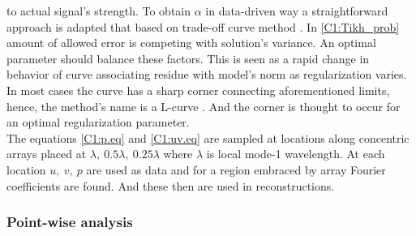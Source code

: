 \documentclass[12pt]{article}
\begin{document}
to actual signal's strength. To obtain $\alpha$ in data-driven way a straightforward approach is 
adapted that based on 
trade-off curve method \citep{hansen1993use}. In \eqref{C1:Tikh_prob} amount of allowed error 
is competing with solution's variance. An optimal parameter should balance these factors. This is 
seen as a rapid change in behavior of curve associating residue with model's norm as regularization 
varies. In most cases the curve has a sharp corner connecting aforementioned limits, hence, the 
method's name is a L-curve \citep{hansen1999curve}. And the corner is thought to occur for an 
optimal regularization parameter.\\
The equations \eqref{C1:p.eq} and \eqref{C1:uv.eq} are sampled at locations along concentric 
arrays placed at $\lambda,~0.5\lambda,~0.25\lambda$ where $\lambda$ is local mode-1 wavelength. 
At each location $u,~v,~p$ are used as data and for a region embraced by array Fourier coefficients 
are found. And these then are used in reconstructions.
\subsubsection{Point-wise analysis}
\label{C3.app:A2}
\end{document}
